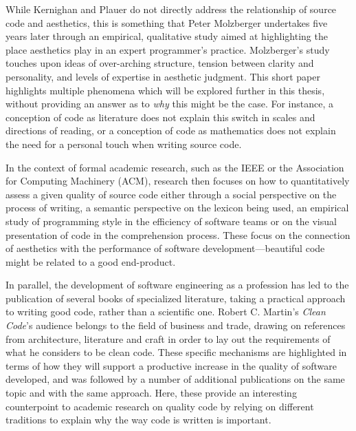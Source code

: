 While Kernighan and Plauer do not directly address the relationship of source code and aesthetics, this is something that Peter Molzberger undertakes five years later through an empirical, qualitative study aimed at highlighting the place aesthetics play in an expert programmer's practice\cite{molzberger_aesthetics_1983}. Molzberger's study touches upon ideas of over-arching structure, tension between clarity and personality, and levels of expertise in aesthetic judgment. This short paper highlights multiple phenomena which will be explored further in this thesis, without providing an answer as to \emph{why} this might be the case. For instance, a conception of code as literature does not explain this switch in scales and directions of reading, or a conception of code as mathematics does not explain the need for a personal touch when writing source code\cite{molzberger_aesthetics_1983}.

In the context of formal academic research, such as the IEEE or the Association for Computing Machinery (ACM), research then focuses on how to quantitatively assess a given quality of source code either through a social perspective on the process of writing\cite{norick_effects_2010}, a semantic perspective on the lexicon being used\cite{fakhoury_improving_2019,guerrouj_normalizing_2013}, an empirical study of programming style in the efficiency of software teams\cite{reed_sometimes_2010,coleman_aesthetics_2018} or on the visual presentation of code in the comprehension process\cite{marcus_graphic_1982}. These focus on the connection of aesthetics with the performance of software development—beautiful code might be related to a good end-product.

In parallel, the development of software engineering as a profession has led to the publication of several books of specialized literature, taking a practical approach to writing good code, rather than a scientific one. Robert C. Martin's \emph{Clean Code}'s audience belongs to the field of business and trade, drawing on references from architecture, literature and craft in order to lay out the requirements of what he considers to be clean code. These specific mechanisms are highlighted in terms of how they will support a productive increase in the quality of software developed, and was followed by a number of additional publications on the same topic and with the same approach\cite{fowler_refactoring_1999,arns_code_2005,hunt_pragmatic_1999}. Here, these provide an interesting counterpoint to academic research on quality code by relying on different traditions to explain why the way code is written is important.

